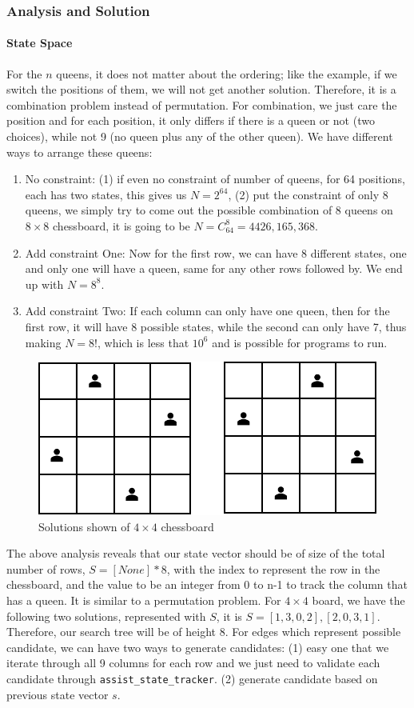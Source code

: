 \documentclass[../main.tex]{subfiles}
\begin{document}
\begin{enumerate}
\subsubsection{Analysis and Solution}
\paragraph{State Space} For the $n$ queens, it does not matter about the ordering; like the example, if we switch the positions of them, we will not get another solution. Therefore, it is a combination problem instead of permutation. For combination, we just care the position and for each position, it only differs if there is a queen or not (two choices), while not 9 (no queen plus any of the other queen). We have different ways to arrange these queens:
\begin{enumerate}
    \item No constraint: (1) if even no constraint of number of queens, for 64 positions, each has two states, this gives us $N=2^{64}$, (2) put the constraint of only 8 queens, we simply try to come out the possible combination of 8 queens on $8\times 8$ chessboard, it is going to be  $N = C_{64}^{8} =4426, 165,368$.
    \item Add constraint One: Now for the first row, we can have 8 different states, one and only one will have a queen, same for any other rows followed by. We end up with $N=8^8$.
    \item Add constraint Two: If each column can only have one queen, then for the first row, it will have 8 possible states, while the second can only have 7, thus making $N=8!$, which is less that $10^6$ and is possible for programs to run. 
\end{enumerate}
\begin{figure}[!ht]
    \centering
    \includegraphics[width=0.6\columnwidth]{fig/n_queen_four.png}
    \caption{Solutions shown of $4 \times 4$ chessboard}
    \label{fig:n_queen_four}
\end{figure}
The above analysis reveals that our state vector should be of size of the total number of rows, $S=[None]*8$, with the index to represent the row in the chessboard, and the value to be an integer from 0 to n-1 to track the column that has a queen. It is similar to a permutation problem. For $4\times 4$ board, we have the following two solutions, represented with $S$, it is $S=[1, 3, 0, 2], [2, 0, 3, 1]$.  Therefore, our search tree will be of height 8. For edges which represent possible candidate, we can have two ways to generate candidates: (1) easy one that we iterate through all 9 columns for each row and we just need to validate each candidate through \texttt{assist\_state\_tracker}. (2) generate candidate based on previous state vector $s$. 


\end{enumerate}
\end{document}
